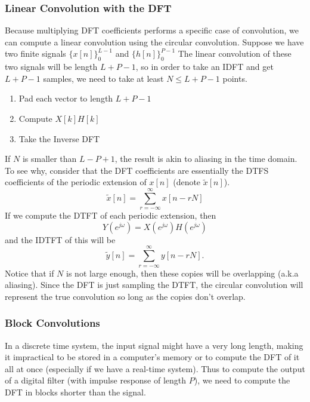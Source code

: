 \subsubsection{Linear Convolution with the DFT}
Because multiplying DFT coefficients performs a specific case of convolution, we can compute a linear convolution using the circular convolution.
Suppose we have two finite signals $\{x[n]\}_0^{L-1}$ and $\{h[n]\}_0^{P-1}$
The linear convolution of these two signals will be length $L+P-1$, so in order to take an IDFT and get $L+P-1$ samples, we need to
take at least $N\le L+P-1$ points.
\begin{enumerate}[1.]
  \item Pad each vector to length $L+P-1$
  \item Compute $X[k]H[k]$
  \item Take the Inverse DFT
\end{enumerate}
If $N$ is smaller than $L-P+1$, the result is akin to aliasing in the time domain.
To see why, consider that the DFT coefficients are essentially the DTFS coefficients of the periodic extension of $x[n]$ (denote $\tilde{x}[n]$).
\[
  \tilde{x}[n]=\sum_{r=-\infty}^{\infty}x[n-rN]
\]
If we compute the DTFT of each periodic extension, then
\[
  Y(e^{j\omega})=X(e^{j\omega})H(e^{j\omega})
\]
and the IDTFT of this will be
\[
  \tilde{y}[n] = \sum_{r=-\infty}^{\infty}y[n-rN].
\]
Notice that if $N$ is not large enough, then these copies will be overlapping (a.k.a aliasing).
Since the DFT is just sampling the DTFT, the circular convolution will represent the true convolution so long as the copies don't overlap.
\subsubsection{Block Convolutions}
In a discrete time system, the input signal might have a very long length, making it impractical to be stored in a computer's memory or to compute the DFT of it all at once (especially if we have a real-time system). 
Thus to compute the output of a digital filter (with impulse response of length $P$), we need to compute the DFT in blocks shorter than the signal.

